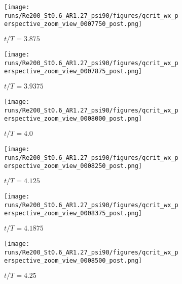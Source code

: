 \begin{figure}
  \centering
  \begin{subfigure}[b]{0.3\textwidth}
    \centering
    \texttt{[image: runs/Re200\_St0.6\_AR1.27\_psi90/figures/qcrit\_wx\_perspective\_zoom\_view\_0007750\_post.png]}
    \caption{$t / T = 3.875$}
    \label{fig:baseline_qcrit_perspective:0007750}
  \end{subfigure}
  \hspace{0.5em}
  \begin{subfigure}[b]{0.3\textwidth}
    \centering
    \texttt{[image: runs/Re200\_St0.6\_AR1.27\_psi90/figures/qcrit\_wx\_perspective\_zoom\_view\_0007875\_post.png]}
    \caption{$t / T = 3.9375$}
    \label{fig:baseline_qcrit_perspective:0007875}
  \end{subfigure}
  \hspace{0.5em}
  \begin{subfigure}[b]{0.3\textwidth}
    \centering
    \texttt{[image: runs/Re200\_St0.6\_AR1.27\_psi90/figures/qcrit\_wx\_perspective\_zoom\_view\_0008000\_post.png]}
    \caption{$t / T = 4.0$}
    \label{fig:baseline_qcrit_perspective:0008000}
  \end{subfigure}
  \vspace{0.5em}
  \begin{subfigure}[b]{0.3\textwidth}
    \centering
    \texttt{[image: runs/Re200\_St0.6\_AR1.27\_psi90/figures/qcrit\_wx\_perspective\_zoom\_view\_0008250\_post.png]}
    \caption{$t / T = 4.125$}
    \label{fig:baseline_qcrit_perspective:0008250}
  \end{subfigure}
  \hspace{0.5em}
  \begin{subfigure}[b]{0.3\textwidth}
    \centering
    \texttt{[image: runs/Re200\_St0.6\_AR1.27\_psi90/figures/qcrit\_wx\_perspective\_zoom\_view\_0008375\_post.png]}
    \caption{$t / T = 4.1875$}
    \label{fig:baseline_qcrit_perspective:0008375}
  \end{subfigure}
  \hspace{0.5em}
  \begin{subfigure}[b]{0.3\textwidth}
    \centering
    \texttt{[image: runs/Re200\_St0.6\_AR1.27\_psi90/figures/qcrit\_wx\_perspective\_zoom\_view\_0008500\_post.png]}
    \caption{$t / T = 4.25$}
    \label{fig:baseline_qcrit_perspective:0008500}
  \end{subfigure}
  \vspace{0.5em}
  \begin{subfigure}[b]{0.3\textwidth}

\end{subfigure}
\end{figure}
